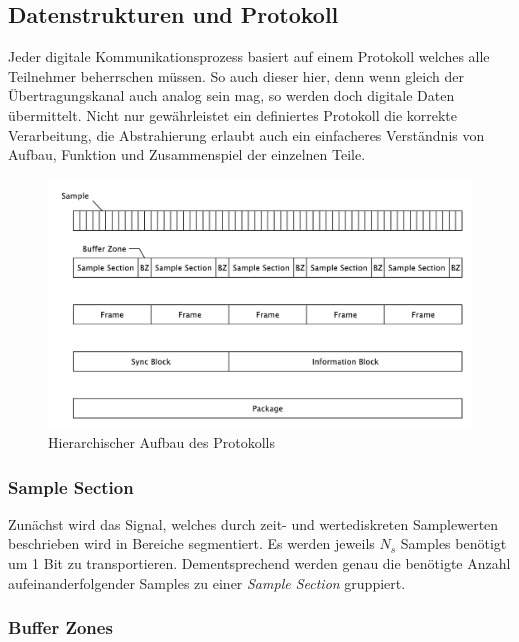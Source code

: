 
\subsection{Datenstrukturen und Protokoll}
\label{sec:protokoll}

Jeder digitale Kommunikationsprozess basiert auf einem Protokoll welches alle Teilnehmer beherrschen müssen. So auch dieser hier, denn wenn gleich der Übertragungskanal auch analog sein mag, so werden doch digitale Daten übermittelt. Nicht nur gewährleistet ein definiertes Protokoll die korrekte Verarbeitung, die Abstrahierung erlaubt auch ein einfacheres Verständnis von Aufbau, Funktion und Zusammenspiel der einzelnen Teile. 

\begin{figure}[h]
	\centering
	\includegraphics[width=\textwidth]{figures/figures-protocol.pdf}
	\caption{Hierarchischer Aufbau des Protokolls}
	\label{fig:protocol}
\end{figure}

\subsubsection{Sample Section}

Zunächst wird das Signal, welches durch zeit- und wertediskreten Samplewerten beschrieben wird in Bereiche segmentiert. Es werden jeweils $N_s$ Samples benötigt um 1 Bit zu transportieren. Dementsprechend werden genau die benötigte Anzahl aufeinanderfolgender Samples zu einer \textit{Sample Section} gruppiert.  

\subsubsection{Buffer Zones}

